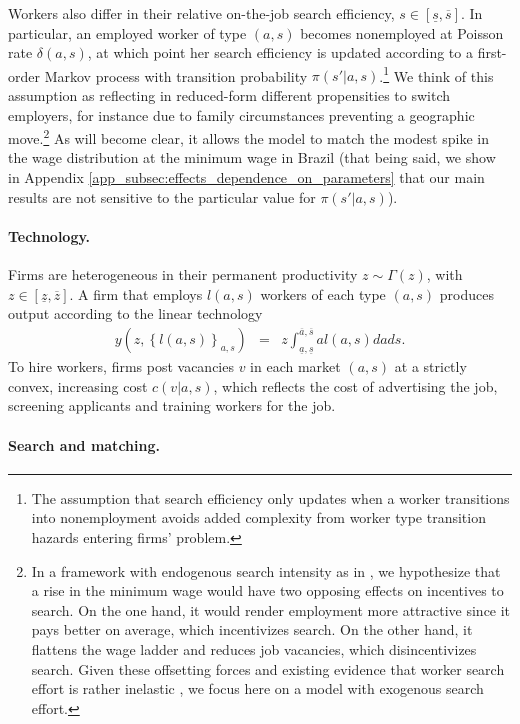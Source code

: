 Workers also differ in their relative on-the-job search efficiency, $s\in[\underline{s},\overline{s}]$. In particular, an employed worker of type $(a,s)$ becomes nonemployed at Poisson rate $\delta(a,s)$, at which point her search efficiency is updated according to a first-order Markov process with transition probability $\pi(s'|a,s)$.\footnote{The assumption that search efficiency only updates when a worker transitions into nonemployment avoids added complexity from worker type transition hazards entering firms' problem.} We think of this assumption as reflecting in reduced-form different propensities to switch employers, for instance due to family circumstances preventing a geographic move.\footnote{In a framework with endogenous search intensity as in \citet{Lentz2010}, we hypothesize that a rise in the minimum wage would have two opposing effects on incentives to search. On the one hand, it would render employment more attractive since it pays better on average, which incentivizes search. On the other hand, it flattens the wage ladder and reduces job vacancies, which disincentivizes search. Given these offsetting forces and existing evidence that worker search effort is rather inelastic \citep{engbom2020}, we focus here on a model with exogenous search effort.} %
As will become clear, it allows the model to match the modest spike in the wage distribution at the minimum wage in Brazil (that being said, we show in Appendix \ref{app_subsec:effects_dependence_on_parameters} that our main results are not sensitive to the particular value for $\pi(s'|a,s)$).

\paragraph{Technology.}

Firms are heterogeneous in their permanent productivity $z \sim \Gamma(z)$, with $z \in [\underline{z},\overline{z}]$. A firm that employs $l(a,s)$ workers of each type $(a,s)$ produces output according to the linear technology
%
\begin{eqnarray*}
  y\left(z,\left\{ l(a,s)\right\} _{a,s}\right) &=& z\int_{\underline{a},\underline{s}}^{\overline{a},\overline{s}} a l(a,s)da ds.
\end{eqnarray*}
%
To hire workers, firms post vacancies $v$ in each market $(a,s)$ at a strictly convex, increasing cost $c(v|a,s)$, which reflects the cost of advertising the job, screening applicants and training workers for the job.


\paragraph{Search and matching.}

